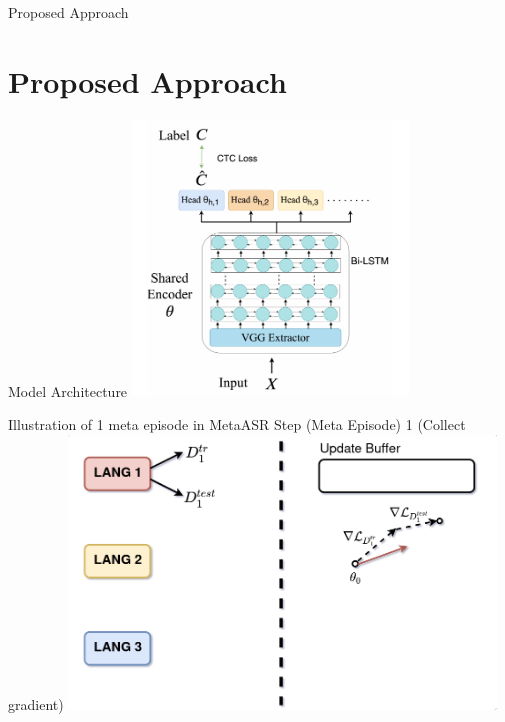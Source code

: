 \documentclass{beamer}
\begin{document}
\begin{frame}
	\begin{center}
    \LARGE{Proposed Approach}
	\end{center}
\end{frame}

\section{Proposed Approach}
\begin{frame}[t]{Model Architecture}
  \center \includegraphics[width=0.55\textwidth]{fig/model_arch.png}
\end{frame}

\begin{frame}[t]{Illustration of 1 meta episode in MetaASR}
  Step (Meta Episode) 1 (Collect gradient)
  \center \includegraphics[width=0.85\textwidth]{fig/meta_step1.png}
\end{frame}
\end{document}
